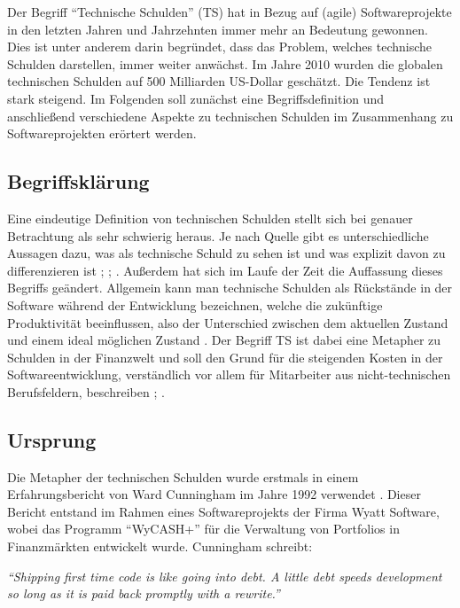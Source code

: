 \documentclass[acmtog]{acmart}
\begin{document}
Der Begriff “Technische Schulden” (TS) hat in Bezug auf (agile)
Softwareprojekte in den letzten Jahren und Jahrzehnten immer mehr an
Bedeutung gewonnen. Dies ist unter anderem darin begründet, dass das
Problem, welches technische Schulden darstellen, immer weiter anwächst.
Im Jahre 2010 wurden die globalen technischen Schulden auf 500 Milliarden
US-Dollar geschätzt\cite{Tom13}. Die Tendenz ist stark steigend. Im Folgenden soll
zunächst eine Begriffsdefinition und anschließend verschiedene Aspekte zu
technischen Schulden im Zusammenhang zu Softwareprojekten erörtert werden.

\subsection{Begriffsklärung}\label{sec:BegriffTS}

Eine eindeutige Definition von technischen Schulden stellt sich bei genauer
Betrachtung als sehr schwierig heraus. Je nach Quelle gibt es
unterschiedliche Aussagen dazu, was als technische Schuld zu sehen ist und
was explizit davon zu differenzieren ist \cite{Tom13}; \cite{Jaspan23}; \cite{Li14}. Außerdem hat sich im Laufe der
Zeit die Auffassung dieses Begriffs geändert. Allgemein kann man technische
Schulden als Rückstände in der Software während der Entwicklung bezeichnen,
welche die zukünftige Produktivität beeinflussen, also der Unterschied
zwischen dem aktuellen Zustand und einem ideal möglichen Zustand \cite{Brown10}.
Der Begriff TS ist dabei eine Metapher zu Schulden in der Finanzwelt und
soll den Grund für die steigenden Kosten in der Softwareentwicklung,
verständlich vor allem für Mitarbeiter aus nicht-technischen Berufsfeldern,
beschreiben \cite{Tom13}; \cite{Ylihuumo16}.

\subsection{Ursprung}\label{sec:UrsprungTS}

Die Metapher der technischen Schulden wurde erstmals in einem
Erfahrungsbericht von Ward Cunningham im Jahre 1992 verwendet \cite{Cunningham92}. Dieser
Bericht entstand im Rahmen eines Softwareprojekts der Firma Wyatt Software,
wobei das Programm “WyCASH+” für die Verwaltung von Portfolios in
Finanzmärkten entwickelt wurde. Cunningham schreibt:

\textit{“Shipping first time code is like going into debt. A little debt speeds
  development so long as it is paid back promptly with a rewrite.”} \cite{Cunningham92}
\end{document}
